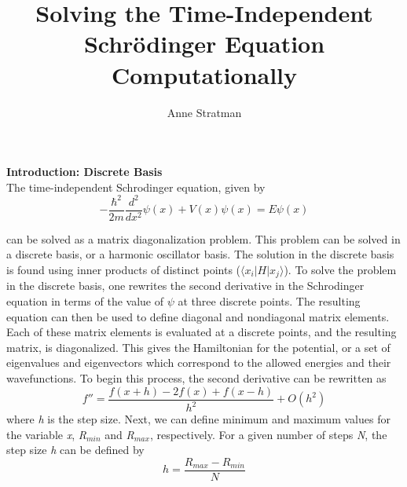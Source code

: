 \documentclass[%
 reprint,
 amsmath,amssymb,
 aps,
]{revtex4-1}
\begin{document}



\title{Solving the Time-Independent Schr\"{o}dinger Equation Computationally}

\author{Anne Stratman}
%

\maketitle								%





\noindent \textbf{Introduction: Discrete Basis}\\

\noindent The time-independent Schrodinger equation, given by
\begin{equation}
-\frac{\hbar^2}{2m}\frac{d^2}{dx^2}\psi(x)+V(x)\psi(x)=E\psi(x)
\end{equation}

\noindent can be solved as a matrix diagonalization problem.  This problem can be solved in a discrete basis, or a harmonic oscillator basis.  The solution in the discrete basis is found using inner products of distinct points ($\langle x_i|H|x_j\rangle$).  To solve the problem in the discrete basis, one rewrites the second derivative in the Schrodinger equation in terms of the value of $\psi$ at three discrete points.  The resulting equation can then be used to define diagonal and nondiagonal matrix elements.  Each of these matrix elements is evaluated at a discrete points, and the resulting matrix, is diagonalized.  This gives the Hamiltonian for the potential, or a set of eigenvalues and eigenvectors which correspond to the allowed energies and their wavefunctions.  To begin this process, the second derivative can be rewritten as
\begin{equation}
f''=\frac{f(x+h)-2f(x)+f(x-h)}{h^2}+O(h^2)
\end{equation}
\noindent where \textit{h} is the step size.  Next, we can define minimum and maximum values for the variable \textit{x}, \textit{R}$_{min}$ and \textit{R}$_{max}$, respectively.  For a given number of steps \textit{N}, the step size \textit{h} can be defined by
\begin{equation}
h=\frac{R_{max}-R_{min}}{N}
\end{equation}
\end{document}

